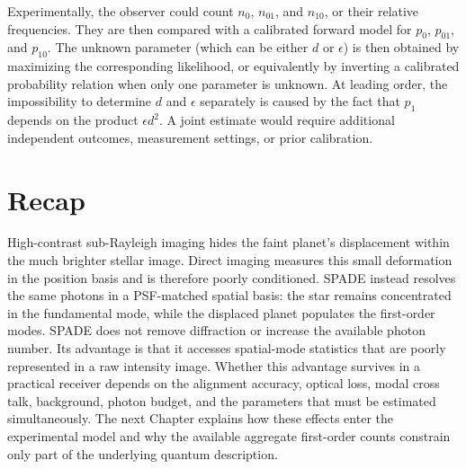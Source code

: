 Experimentally, the observer could count $n_0$, $n_{01}$, and $n_{10}$, or their relative frequencies. They are then compared with a calibrated forward model for $p_0$, $p_{01}$, and $p_{10}$.  The unknown parameter (which can be either $d$ or $\epsilon$) is then obtained by maximizing the corresponding likelihood, or equivalently by inverting a calibrated probability relation when only one parameter is unknown. At leading order, the impossibility to determine $d$ and $\epsilon$ separately is caused by the fact that $p_1$ depends on the product $\epsilon d^2$.  A joint estimate would require additional independent outcomes, measurement settings, or prior calibration.


\section{Recap}

High-contrast sub-Rayleigh imaging hides the faint planet's displacement within the much brighter stellar image.  Direct imaging measures this small deformation in the position basis and is therefore poorly conditioned.  SPADE instead resolves the same photons in a PSF-matched spatial basis: the star remains concentrated in the fundamental mode, while the displaced planet populates the first-order modes. SPADE does not remove diffraction or increase the available photon number. Its advantage is that it accesses spatial-mode statistics that are poorly represented in a raw intensity image.  Whether this advantage survives in a practical receiver depends on the alignment accuracy, optical loss, modal cross talk, background, photon budget, and the parameters that must be estimated simultaneously. The next Chapter explains how these effects enter the experimental model and why the available aggregate first-order counts constrain only part of the underlying quantum description.
